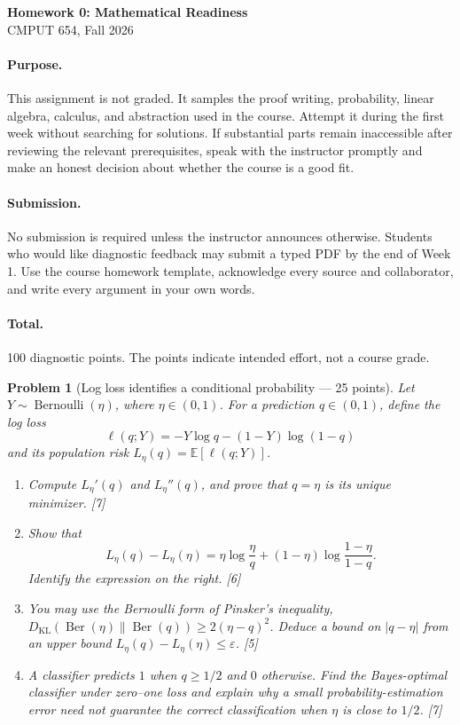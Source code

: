 \documentclass[11pt]{article}
\newcommand{\E}{\mathbb{E}}
\theoremstyle{courseproblem}
\newtheorem{problem}{Problem}
\begin{document}
\begin{center}
{\Large\bfseries Homework 0: Mathematical Readiness}\\[0.35em]
{\large CMPUT 654, Fall 2026}
\end{center}

\paragraph{Purpose.}
This assignment is not graded. It samples the proof writing, probability,
linear algebra, calculus, and abstraction used in the course. Attempt it during
the first week without searching for solutions. If substantial parts remain
inaccessible after reviewing the relevant prerequisites, speak with the
instructor promptly and make an honest decision about whether the course is a
good fit.

\paragraph{Submission.}
No submission is required unless the instructor announces otherwise. Students
who would like diagnostic feedback may submit a typed PDF by the end of Week 1.
Use the course homework template, acknowledge every source and collaborator,
and write every argument in your own words.

\paragraph{Total.} 100 diagnostic points. The points indicate intended effort,
not a course grade.

\begin{problem}[Log loss identifies a conditional probability --- 25 points]
Let $Y\sim\operatorname{Bernoulli}(\eta)$, where $\eta\in(0,1)$. For a
prediction $q\in(0,1)$, define the log loss
\[
\ell(q;Y)=-Y\log q-(1-Y)\log(1-q)
\]
and its population risk $L_\eta(q)=\E[\ell(q;Y)]$.
\begin{enumerate}[label=(\alph*)]
  \item Compute $L_\eta'(q)$ and $L_\eta''(q)$, and prove that $q=\eta$ is
  its unique minimizer. \hfill [7]
  \item Show that
  \[
  L_\eta(q)-L_\eta(\eta)
  =\eta\log\frac{\eta}{q}+(1-\eta)\log\frac{1-\eta}{1-q}.
  \]
  Identify the expression on the right. \hfill [6]
  \item You may use the Bernoulli form of Pinsker's inequality,
  $D_{\mathrm{KL}}(\operatorname{Ber}(\eta)\|\operatorname{Ber}(q))
  \ge 2(\eta-q)^2$. Deduce a bound on $|q-\eta|$ from an upper bound
  $L_\eta(q)-L_\eta(\eta)\le\varepsilon$. \hfill [5]
  \item A classifier predicts $1$ when $q\ge 1/2$ and $0$ otherwise. Find
  the Bayes-optimal classifier under zero--one loss and explain why a small
  probability-estimation error need not guarantee the correct classification
  when $\eta$ is close to $1/2$. \hfill [7]
\end{enumerate}
\end{problem}
\end{document}
